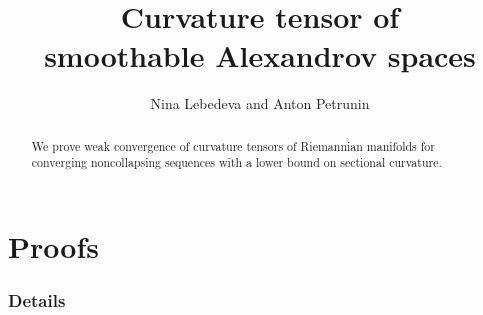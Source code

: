 \documentclass{article}
\begin{document}

\title{Curvature tensor of\\ smoothable Alexandrov spaces}
\date{}
\author{Nina Lebedeva and Anton Petrunin} 
\maketitle

\begin{abstract}
We prove weak convergence of curvature tensors of Riemannian manifolds 
for converging noncollapsing sequences with a lower bound on sectional curvature.
\end{abstract}




\tableofcontents




\part*{Proofs}











%

%
%
%

\section*{Details}






{\sloppy

\def\emph{\textit}
\printbibliography[heading=bibintoc]
\fussy
}
\end{document}
